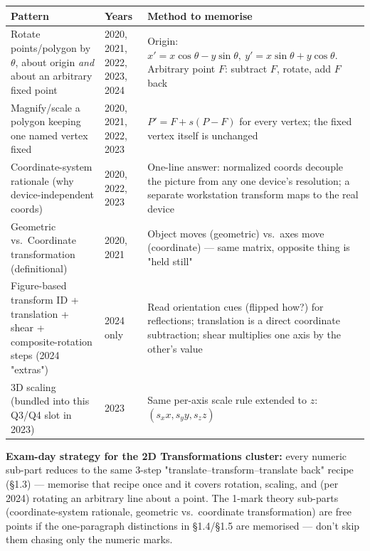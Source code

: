 \documentclass[12pt, a4paper]{article}
\newenvironment{notesbox}{\begin{mdframed}[style=notesframe]}{\end{mdframed}}
\begin{document}
\begin{center}
\renewcommand{\arraystretch}{1.3}
\begin{tabular}{p{5cm}|p{2.7cm}|p{6.3cm}}
\toprule
\textbf{Pattern} & \textbf{Years} & \textbf{Method to memorise} \\
\midrule
Rotate points/polygon by $\theta$, about origin \emph{and} about an arbitrary fixed point & 2020, 2021, 2022, 2023, 2024 & Origin: $x'=x\cos\theta-y\sin\theta,\ y'=x\sin\theta+y\cos\theta$. Arbitrary point $F$: subtract $F$, rotate, add $F$ back \\
Magnify/scale a polygon keeping one named vertex fixed & 2020, 2021, 2022, 2023 & $P'=F+s(P-F)$ for every vertex; the fixed vertex itself is unchanged \\
Coordinate-system rationale (why device-independent coords) & 2020, 2022, 2023 & One-line answer: normalized coords decouple the picture from any one device's resolution; a separate workstation transform maps to the real device \\
Geometric vs.\ Coordinate transformation (definitional) & 2020, 2021 & Object moves (geometric) vs.\ axes move (coordinate) --- same matrix, opposite thing is "held still" \\
Figure-based transform ID + translation + shear + composite-rotation steps (2024 "extras") & 2024 only & Read orientation cues (flipped how?) for reflections; translation is a direct coordinate subtraction; shear multiplies one axis by the other's value \\
3D scaling (bundled into this Q3/Q4 slot in 2023) & 2023 & Same per-axis scale rule extended to $z$: $(s_xx,s_yy,s_zz)$ \\
\bottomrule
\end{tabular}
\end{center}

\begin{notesbox}
\textbf{Exam-day strategy for the 2D Transformations cluster:} every numeric sub-part reduces to the same 3-step "translate--transform--translate back" recipe (\S1.3) --- memorise that recipe once and it covers rotation, scaling, and (per 2024) rotating an arbitrary line about a point. The 1-mark theory sub-parts (coordinate-system rationale, geometric vs.\ coordinate transformation) are free points if the one-paragraph distinctions in \S1.4/\S1.5 are memorised --- don't skip them chasing only the numeric marks.
\end{notesbox}
\end{document}
